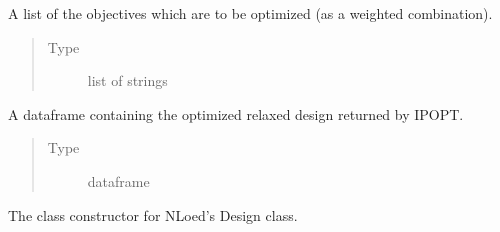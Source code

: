 \documentclass[letterpaper,10pt,english,openany,oneside]{sphinxmanual}
\begin{document}
\begin{fulllineitems}
\begin{fulllineitems}
\begin{quote}
\begin{description}
\end{description}\end{quote}

\end{fulllineitems}


\begin{fulllineitems}
\label{\detokenize{nloed:nloed.design.Design.objective_list}}
A list of the objectives which are to be optimized (as
a weighted combination).
\begin{quote}\begin{description}
\item[{Type}] \leavevmode
list of strings

\end{description}\end{quote}

\end{fulllineitems}


\begin{fulllineitems}
\label{\detokenize{nloed:nloed.design.Design.relaxed_design}}
A dataframe containing the optimized relaxed design returned
by IPOPT.
\begin{quote}\begin{description}
\item[{Type}] \leavevmode
dataframe

\end{description}\end{quote}

\end{fulllineitems}


\begin{fulllineitems}
\label{\detokenize{nloed:nloed.design.Design.__init__}}
The class constructor for NLoed’s Design class.


\end{fulllineitems}
\end{fulllineitems}
\end{document}
